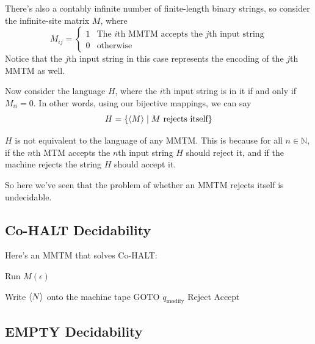 \documentclass[12pt]{article}
\newcommand{\N}{\mathbb{N}}
\begin{document}
There's also a contably infinite number of finite-length binary strings, so consider
the infinite-site matrix $M$, where
\[M_{ij}=\begin{cases}
    1 & \text{The $i$th MMTM accepts the $j$th input string} \\
    0 & \text{otherwise}
\end{cases}\]
Notice that the $j$th input string in this case represents the encoding of the $j$th MMTM as well.

Now consider the language $H$, where the $i$th input string is in it if and only if $M_{ii}=0$.
In other words, using our bijective mappings, we can say
\[H=\{\braket{M} \mid \text{$M$ rejects itself}\}\]

$H$ is not equivalent to the language of any MMTM.
This is because for all $n \in \N$, if the $n$th MTM accepts the $n$th input string
$H$ should reject it, and if the machine rejects the string $H$ should accept it.

So here we've seen that the problem of whether an MMTM rejects itself is undecidable.

\pagebreak

\subsection{Co-HALT Decidability}

Here's an MMTM that solves Co-HALT:
\begin{algorithmic}[1]
            \State Run $M(\epsilon)$
        \EndProcedure

        \item[]
        \State Write $\Braket{N}$ onto the machine tape
        \State GOTO $q_{\text{modify}}$
            \State Reject
            \State Accept
        \EndIf
    \EndProcedure
\end{algorithmic}

\pagebreak

\subsection{EMPTY Decidability}
\end{document}
